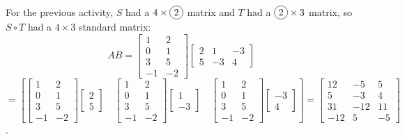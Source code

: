 \begin{applicationActivities}
\begin{definition}
\vspace{1em}

For the previous activity, \(S\) had a \(4\times \circledNumber{2}\) matrix and
\(T\) had a \(\circledNumber{2}\times 3\) matrix, so \(S\circ T\) had a
\(4\times 3\) standard matrix:
\[
  AB
    =
  \begin{bmatrix} 1 & 2 \\ 0 & 1 \\ 3 & 5 \\ -1 & -2 \end{bmatrix}
  \begin{bmatrix} 2 & 1 & -3 \\ 5 & -3 & 4 \end{bmatrix}
\]
\[
    =
  \left[
  \begin{bmatrix} 1 & 2 \\ 0 & 1 \\ 3 & 5 \\ -1 & -2 \end{bmatrix}
  \begin{bmatrix} 2 \\ 5\end{bmatrix}
    \hspace{1em}
  \begin{bmatrix} 1 & 2 \\ 0 & 1 \\ 3 & 5 \\ -1 & -2 \end{bmatrix}
  \begin{bmatrix} 1 \\ -3\end{bmatrix}
    \hspace{1em}
  \begin{bmatrix} 1 & 2 \\ 0 & 1 \\ 3 & 5 \\ -1 & -2 \end{bmatrix}
  \begin{bmatrix} -3 \\ 4\end{bmatrix}
  \right]
    =
  \begin{bmatrix}
    12 & -5 & 5 \\
    5 & -3 & 4 \\
    31 & -12 & 11 \\
    -12 & 5 & -5
  \end{bmatrix}
\].
\end{definition}


\end{applicationActivities}
